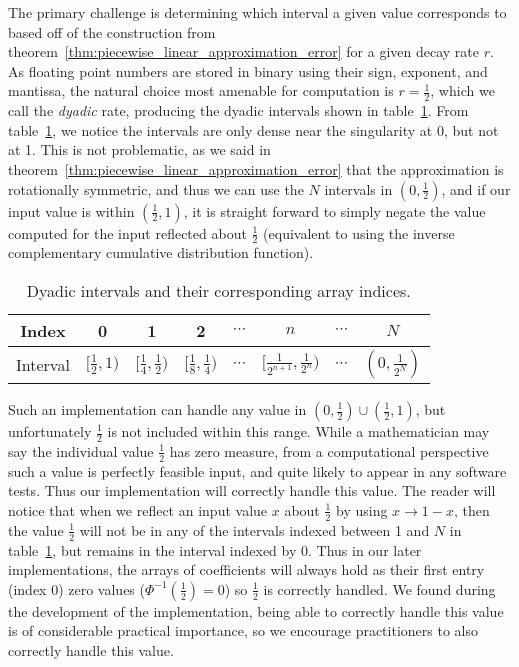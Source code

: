 \documentclass[manuscript,review]{acmart}
\begin{document}
The primary challenge is determining which interval a given value corresponds to based off of the construction from theorem~\ref{thm:piecewise_linear_approximation_error} for a given decay rate $ r $. As floating point numbers are stored in binary using their sign, exponent, and mantissa, the natural choice most amenable for computation is $ r = \tfrac{1}{2} $, which we call the \emph{dyadic} rate, producing the dyadic intervals shown in table~\ref{tab:dyadic_intervals}. From table~\ref{tab:dyadic_intervals}, we notice the intervals are only dense near the singularity at 0, but not at 1. This is not problematic, as we said in theorem~\ref{thm:piecewise_linear_approximation_error} that the approximation is rotationally symmetric, and thus we can use the $ N $ intervals in $ (0, \tfrac{1}{2}) $, and if our input value is within $ (\tfrac{1}{2}, 1) $, it is straight forward to simply negate the value computed for the input reflected about $ \tfrac{1}{2} $ (equivalent to using the inverse complementary cumulative distribution function). 

\begin{table}[htb]
\centering
\caption{Dyadic intervals and their corresponding array indices.}
\label{tab:dyadic_intervals}
\renewcommand{\arraystretch}{1.4}  %
\begin{tabular}{c|ccccccc}
Index & 0 & 1 & 2 & $ \cdots $ & $ n $ & $ \cdots $ & $ N $ \\ \hline
Interval & $ [\tfrac{1}{2}, 1) $ & $ [\tfrac{1}{4}, \tfrac{1}{2}) $ & $ [\tfrac{1}{8}, \tfrac{1}{4}) $ & $ \cdots $ & $ [\tfrac{1}{2^{n+1}}, \tfrac{1}{2^n}) $ & $ \cdots $ & $ (0, \tfrac{1}{2^N}) $
\end{tabular}
\end{table}

Such an implementation can handle any value in $ (0, \tfrac{1}{2}) \cup (\tfrac{1}{2}, 1) $, but unfortunately $ \tfrac{1}{2} $ is not included within this range. While a mathematician may say the individual value $ \tfrac{1}{2} $ has zero measure, from a computational perspective such a value is perfectly feasible input, and quite likely to appear in any software tests. Thus our implementation will correctly handle this value. The reader will notice that when we reflect an input value $ x $ about $ \tfrac{1}{2} $ by using $ x \to 1 - x $, then the value $ \tfrac{1}{2} $ will not be in any of the intervals indexed between 1 and $ N $ in table~\ref{tab:dyadic_intervals}, but remains in the interval indexed by 0. Thus in our later implementations, the arrays of coefficients will always hold as their first entry (index 0) zero values ($ \Phi^{-1}(\tfrac{1}{2}) = 0 $) so $ \tfrac{1}{2} $ is correctly handled. We found during the development of the implementation, being able to correctly handle this value is of considerable practical importance, so we encourage practitioners to also correctly handle this value. 
\end{document}
